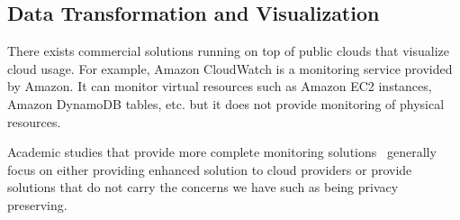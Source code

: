 \subsection{Data Transformation and Visualization}

There exists commercial solutions running on top of public clouds that visualize cloud usage. For example, Amazon CloudWatch is a monitoring service provided by Amazon. It can monitor virtual resources such as Amazon EC2 instances, Amazon DynamoDB tables, etc. but it does not provide monitoring of physical resources. 

Academic studies that provide more complete monitoring solutions~\cite{chaves2011toward, montes2013gmone, povedano2013dargos, alcaraz2015monpaas} generally focus on either providing enhanced solution to cloud providers or provide solutions that do not carry the concerns we have such as being privacy preserving.